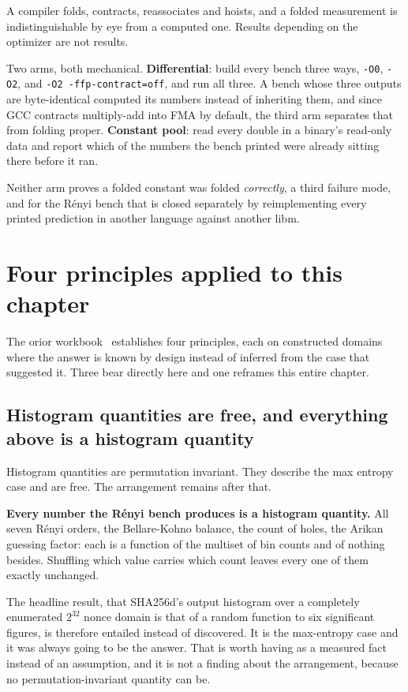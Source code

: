 A compiler folds, contracts, reassociates and hoists, and a folded measurement is indistinguishable by eye from a computed one. Results depending on the optimizer are not results.

Two arms, both mechanical. \textbf{Differential}: build every bench three ways, \texttt{-O0}, \texttt{-O2}, and \texttt{-O2 -ffp-contract=off}, and run all three. A bench whose three outputs are byte-identical computed its numbers instead of inheriting them, and since GCC contracts multiply-add into FMA by default, the third arm separates that from folding proper. \textbf{Constant pool}: read every double in a binary's read-only data and report which of the numbers the bench printed were already sitting there before it ran.

Neither arm proves a folded constant was folded \emph{correctly}, a third failure mode, and for the Rényi bench that is closed separately by reimplementing every printed prediction in another language against another libm.

\section{Four principles applied to this chapter}

The orior workbook~\cite{src:Quigg-orior-workbook} establishes four principles, each on constructed domains where the answer is known by design instead of inferred from the case that suggested it. Three bear directly here and one reframes this entire chapter.

\subsection{Histogram quantities are free, and everything above is a histogram quantity}

Histogram quantities are permutation invariant. They describe the max entropy case and are free. The arrangement remains after that.

\textbf{Every number the Rényi bench produces is a histogram quantity.} All seven Rényi orders, the Bellare-Kohno balance, the count of holes, the Arikan guessing factor: each is a function of the multiset of bin counts and of nothing besides. Shuffling which value carries which count leaves every one of them exactly unchanged.

The headline result, that SHA256d's output histogram over a completely enumerated \(2^{32}\) nonce domain is that of a random function to six significant figures, is therefore entailed instead of discovered. It is the max-entropy case and it was always going to be the answer. That is worth having as a measured fact instead of an assumption, and it is not a finding about the arrangement, because no permutation-invariant quantity can be.

